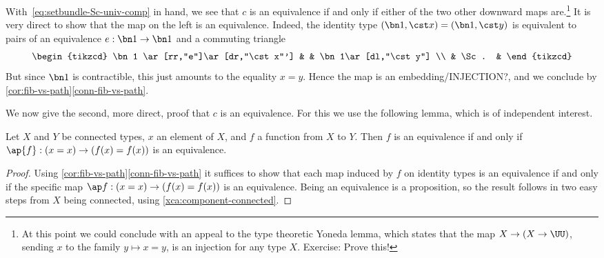 With~\eqref{eq:setbundle-Sc-univ-comp} in hand, we see that $c$ is an equivalence
if and only if either of the two other downward maps are.\footnote{%
  At this point we could conclude with an appeal to the type theoretic Yoneda lemma,
  which states that the map $X \to (X \to \UU)$,
  sending $x$ to the family $y \mapsto x=y$,
  is an injection for any type $X$.
  Exercise: Prove this!}
It is very direct to show that the map on the left is an equivalence.
Indeed, the identity type $(\bn 1,\cst x)=(\bn 1,\cst y)$
is equivalent to pairs of an equivalence $e : \bn 1 \to \bn 1$ and a commuting triangle
\[
  \begin{tikzcd}
    \bn 1 \ar[rr,"e"]\ar[dr,"\cst x"'] & & \bn 1\ar[dl,"\cst y"] \\
    & \Sc. &
  \end{tikzcd}
\]
But since $\bn 1$ is contractible, this just amounts to the equality $x=y$.
Hence the map is an embedding/INJECTION?, and we conclude by \cref{cor:fib-vs-path}\ref{conn-fib-vs-path}.

We now give the second, more direct, proof that $c$ is an equivalence.
For this we use the following lemma, which is of independent interest.
\begin{lemma}\label{lem:conn-eq-f-ap-f-x}
Let $X$ and $Y$ be connected types, $x$ an element of $X$,
and $f$ a function from $X$ to $Y$. Then $f$ is an equivalence
if and only if $\ap{f}: (x=x) \to (f(x)=f(x))$ is an equivalence.
\end{lemma}
\begin{proof}
Using \cref{cor:fib-vs-path}\ref{conn-fib-vs-path} it suffices to show that
each map induced by $f$ on identity types is an equivalence if and only if the specific map
$\ap f : (x=x) \to (f(x) = f(x))$ is an equivalence.  Being an equivalence is a proposition,
so the result follows in two easy steps from $X$ being connected,
using \cref{xca:component-connected}.
\end{proof}

